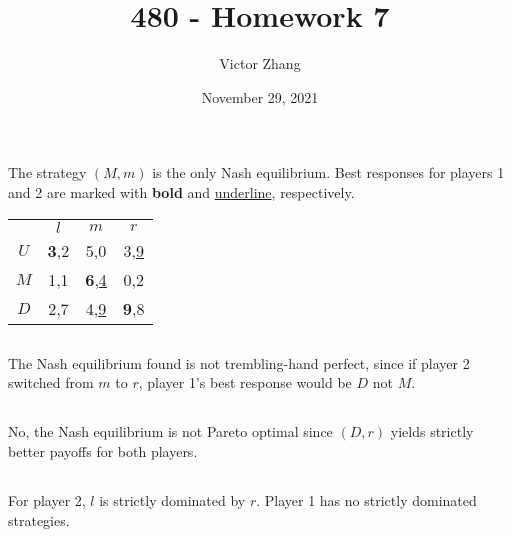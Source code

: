 \documentclass{article}
\title{480 - Homework 7}
\author{Victor Zhang}
\date{November 29, 2021}
\begin{document}
\maketitle

\section{}
\subsection{}
The strategy $(M,m)$ is the only Nash equilibrium. Best responses for players 1 and 2 are marked with \textbf{bold} and \underline{underline}, respectively.
\begin{center}
\begin{tabular}{c c c c}
 & $l$ & $m$ & $r$\\
$U$ & \textbf{3},2 & 5,0 & 3,\underline{9}\\
$M$ & 1,1 & \textbf{6},\underline{4} & 0,2\\
$D$ & 2,7 & 4,\underline{9} & \textbf{9},8
\end{tabular}
\end{center}

\subsection{}
The Nash equilibrium found is not trembling-hand perfect, since if player 2 switched from $m$ to $r$, player 1's best response would be $D$ not $M$.

\subsection{}
No, the Nash equilibrium is not Pareto optimal since $(D,r)$ yields strictly better payoffs for both players.

\subsection{}
For player 2, $l$ is strictly dominated by $r$. Player 1 has no strictly dominated strategies.

\section{}
\end{document}
